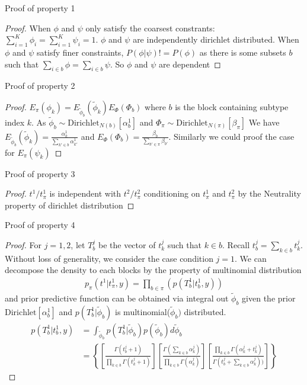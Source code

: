 \documentclass[aoas,preprint]{imsart}
\begin{document}
Proof of property 1
\begin{proof}
When $\phi$ and $\psi$ only satisfy the coarsest constrants: $\sum_{i = 1}^K \phi_i = \sum_{i = 1}^K \psi_i = 1$. $\phi$ and $\psi$ are independently dirichlet distributed.
When $\phi$ and $\psi$ satisfy finer constraints, $P(\phi | \psi ) != P(\phi)$ as there is some subsets $b$ such that $\sum_{i\in b} \phi = \sum_{i \in b} \psi$. So $\phi$ and $\psi$ are dependent
\end{proof}

Proof of property 2
\begin{proof}
$E_{\pi}(\phi_k) = E_{\tilde{\phi}_b}(\tilde{\phi}_k)E_{\Phi}(\Phi_b)$ where $b$ is the block containing subtype index $k$. As $\tilde{\phi}_b \sim  \text{Dirichlet}_{N(b)}[ \alpha_b^1 ]$ and  $\Phi_\pi  \sim \text{Dirichlet}_{N(\pi)}[   \beta_\pi   ] $
We have $E_{\tilde{\phi}_b}(\tilde{\phi}_k) =  \frac{ \alpha^1_k }{ \sum_{k' \in b} \alpha^1_{k'} } $ and $E_{\Phi}(\Phi_b) = \frac{ \beta_b }{ \sum_{b' \in \pi} \beta_{b'} } $. Similarly we could proof the case for $E_{\pi}(\psi_k)$
\end{proof}

Proof of property 3
\begin{proof}
$t^1 / t_{\pi}^1$ is independent with $t^2 / t_{\pi}^2$ conditioning on $t_\pi^1$ and $t_\pi^2$ by the Neutrality property of dirichlet distribution
\end{proof}

Proof of property 4
\begin{proof}
For $j = 1,2$,
let $T_b^j$ be the vector of $t_k^j$ such that $k \in b$. Recall $t_b^j = \sum_{k \in b} t_k^j$.
Without loss of generality, we consider the case condition $j = 1$.
We can decompose the density to each blocks by the property of multinomial distribution
\begin{eqnarray*}
p_\pi(t^1 | t_\pi^1, y) = \prod_{b\in \pi}(p(T_b^1 | t_b^1,y) )
\end{eqnarray*}
and prior predictive function can be obtained via integral out $ \tilde{\phi}_b$ given the prior $\text{Dirichlet} [ \alpha_b^1]$ and  $p(T_b^1  | \tilde{\phi}_b)$ is multinomial($\tilde{\phi}_b)$ distributed.
\begin{align*}
p(T_b^1  | t_b^1,y) &= \int_{\tilde{\phi}_b} p(T_b^1  | \tilde{\phi}_b) p(\tilde{\phi}_b) d\tilde{\phi}_b\\
                                      &= \left\{\left[ \frac{ \Gamma(t^j_b +1 ) }{\prod_{k \in b} \Gamma( t^j_k + 1 ) }\right]
\left[ \frac{\Gamma( \sum_{k \in b} \alpha_k^j )}{
		\prod_{k\in b} \Gamma( \alpha_k^j ) } \right] 
       \left[        \frac{ \prod_{k \in b} \Gamma(\alpha_k^j + t^j_k)  }{
		\Gamma(t^j_b + \sum_{k\in b} \alpha_k^j ) )}\right]\right\}
\end{align*}
\end{proof}
\end{document}
